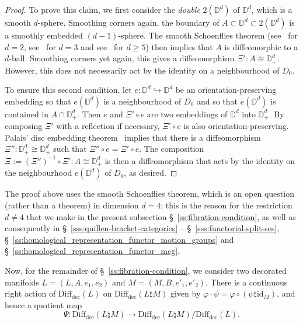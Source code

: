 \documentclass[AHL,Unicode,published]{cedram}
\newcommand{\id}{\mathrm{id}}
\newcommand{\rdec}{\mathrm{dec}}
\newcommand{\bD}{\mathbb{D}}
\newcommand{\too}{\ensuremath{\longrightarrow}}
\newcommand{\diffdec}{\ensuremath{\mathrm{Diff}_{\rdec}}}
\renewcommand{\geq}{\geqslant}
\begin{document}
\begin{proof}
To prove this claim, we first consider the \emph{double} $2(\bD^d)$ of $\bD^d$, which is a smooth $d$-sphere. Smoothing corners again, the boundary of $A \subset \bD^d \subset 2(\bD^d)$ is a smoothly embedded $(d-1)$-sphere. The smooth Schoenflies theorem (see~\cite{Schoenflies1906} for $d=2$, see~\cite{Brown1960,Mazur1959,Morse1960} for $d=3$ and see~\cite[Prop.~D, \S~9]{Milnor1965} for $d\geq 5$) then implies that $A$ is diffeomorphic to a $d$-ball. Smoothing corners yet again, this gives a diffeomorphism $\Xi' \colon A \cong \bD^d_+$. However, this does not necessarily act by the identity on a neighbourhood of $D_0$.

To ensure this second condition, let $e \colon \bD^d \hookrightarrow \bD^d$ be an orientation-preserving embedding so that $e(\bD^d)$ is a neighbourhood of $D_0$ and so that $e(\bD^d)$ is contained in $A \cap \bD^d_+$. Then $e$ and $\Xi' \circ e$ are two embeddings of $\bD^d$ into $\bD^d_+$. By composing $\Xi'$ with a reflection if necessary, $\Xi' \circ e$ is also orientation-preserving. Palais' disc embedding theorem~\cite[Thm.~B]{Palais1960Extendingdiffeomorphisms} implies that there is a diffeomorphism $\Xi'' \colon \bD^d_+ \cong \bD^d_+$ such that $\Xi'' \circ e = \Xi' \circ e$. The composition $\Xi := (\Xi'')^{-1} \circ \Xi' \colon A \cong \bD^d_+$ is then a diffeomorphism that acts by the identity on the neighbourhood $e(\bD^d)$ of $D_0$, as desired.
\end{proof}

\begin{rema}\label{rmk:d_neq_4_explanation}
The proof above uses the smooth Schoenflies theorem, which is an open question (rather than a theorem) in dimension $d=4$; this is the reason for the restriction $d \neq 4$ that we make in the present subsection \S~\ref{ss:fibration-condition}, as well as consequently in \S~\ref{sss:quillen-bracket-categories} -- \S~\ref{sss:functorial-split-ses}, \S~\ref{ss:homological_representation_functor_motion_groups} and \S~\ref{ss:homological_representation_functor_mcg}.
\end{rema}

Now, for the remainder of \S~\ref{ss:fibration-condition}, we consider two decorated manifolds $L = (L,A,e_{1},e_{2})$ and $M = (M,B,e'_{1},e'_{2})$. There is a continuous right action of $\diffdec(L)$ on $\diffdec(L \natural M)$ given by $\varphi \cdot \psi = \varphi \circ (\psi \natural \id_M)$, and hence a quotient map
\begin{equation}\label{eq:quotient-diff}
\Psi \colon \diffdec(L \natural M) \too \diffdec(L \natural M) / \diffdec(L).
\end{equation}
\end{document}
